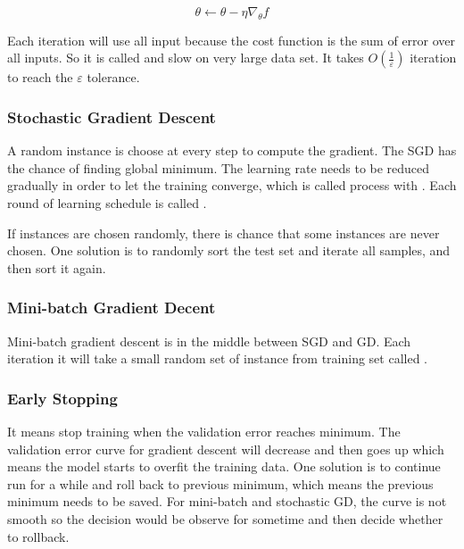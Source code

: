 \begin{equation}\label{gdlearning}
	\theta \gets \theta - \eta \nabla_\theta f
\end{equation}

Each iteration will use all input because the cost function is the sum of error over all inputs. So it is called  and slow on very large data set. It takes $\displaystyle O\left(\frac{1}{\varepsilon}\right)$ iteration to reach the $\varepsilon$ tolerance.



\subsubsection{Stochastic Gradient Descent}

A random instance is choose at every step to compute the gradient. The SGD has the chance of finding global minimum. The learning rate needs to be reduced gradually in order to let the training converge, which is called  process with . Each round of learning schedule is called .

If instances are chosen randomly, there is chance that some instances are never chosen. One solution is to randomly sort the test set and iterate all samples, and then sort it again.



\subsubsection{Mini-batch Gradient Decent}

Mini-batch gradient descent is in the middle between SGD and GD. Each iteration it will take a small random set of instance from training set called .


\subsubsection{Early Stopping}

It means stop training when the validation error reaches minimum. The validation error curve for gradient descent will decrease and then goes up which means the model starts to overfit the training data. One solution is to continue run for a while and roll back to previous minimum, which means the previous minimum needs to be saved. For mini-batch and stochastic GD, the curve is not smooth so the decision would be observe for sometime and then decide whether to rollback.




